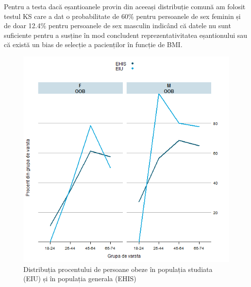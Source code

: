 \documentclass[12pt]{article}
\begin{document}
  Pentru a testa dacă eșantioanele provin din aceeași distribuție comună am folosit testul \ac{KS} care a dat o probabilitate de 60\% pentru persoanele de sex feminin și de doar 12.4\% pentru persoanele de sex masculin indicând că datele nu sunt suficiente pentru a susține în mod concludent reprezentativitatea eșantionului sau că există un bias de selecție a pacienților în funcție de \ac{BMI}.
  \begin{figure}[H]
    \centering
    \includegraphics[width=0.8\linewidth]{incoBMIvsEHIS-OOB}
    \caption{Distribuția procentului de persoane obeze în populația studiata (EIU) și în populația generala (EHIS) }
    \label{fig:incoBMIvsEHIS-OOB}
  \end{figure}
\end{document}
